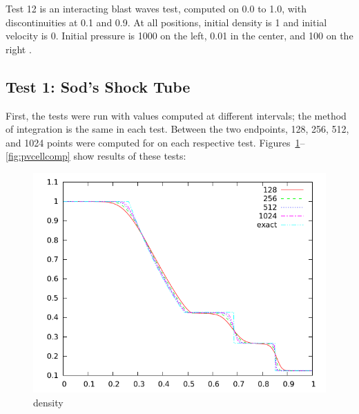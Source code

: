 \documentclass[letterpaper,12pt]{article}
\begin{document}
Test 12 is an interacting blast waves test, computed on 0.0 to 1.0, with discontinuities at 0.1 and 0.9. At all positions, initial density is 1 and initial velocity is 0. Initial pressure is 1000 on the left, 0.01 in the center, and 100 on the right \cite{LiskaWendroff2003}.
\subsection{Test 1: Sod's Shock Tube} 

First, the tests were run with values computed at different intervals; the method of integration is the same in each test. Between the two endpoints, 128, 256, 512, and 1024 points were computed for on each respective test. Figures~\ref{fig:dencellcomp_20}--\ref{fig:pvcellcomp} show results of these tests:
\begin{figure}[h!]
  \begin{center}
    \includegraphics[width=.95\textwidth]{dencellcomp_20}
  \end{center}
  \caption{density}
  \label{fig:dencellcomp_20}
\end{figure}
\end{document}
